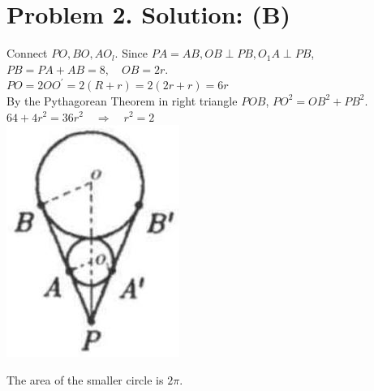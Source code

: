 \documentclass[10pt]{article}
\begin{document}
\section*{Problem 2. Solution: (B)}
Connect \(P O, B O, A O_{l}\). Since \(P A=A B, O B \perp P B, O_{1} A \perp P B\), \(P B=P A+A B=8, \quad O B=2 r\).\\
\(P O=2 O O^{\prime}=2(R+r)=2(2 r+r)=6 r\)\\
By the Pythagorean Theorem in right triangle \(P O B\), \(P O^{2}=O B^{2}+P B^{2}\).\\
\(64+4 r^{2}=36 r^{2} \quad \Rightarrow \quad r^{2}=2\)\\
\includegraphics[max width=\textwidth, center]{2025_04_17_97bc1f7e44d93c271a88g-187(1)}

The area of the smaller circle is \(2 \pi\).
\end{document}
